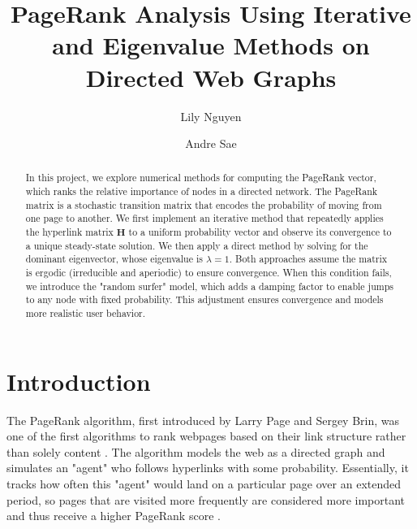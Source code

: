 \documentclass[linenumbers, twocolumn]{aastex631}
\begin{document}
\title{PageRank Analysis Using Iterative and Eigenvalue Methods on Directed Web Graphs}
\author{Lily Nguyen}

\author{Andre Sae}


\begin{abstract}
    In this project, we explore numerical methods for computing the PageRank 
    vector, which ranks the relative importance of nodes in a directed network.
    The PageRank matrix is a stochastic transition matrix that encodes the
    probability of moving from one page to another. We first implement an
    iterative method that repeatedly applies the hyperlink matrix $\boldsymbol{H}$
    to a uniform probability vector and observe its convergence to a unique 
    steady-state solution. We then apply a direct method by solving for the 
    dominant eigenvector, whose eigenvalue is $\lambda=1$. Both approaches 
    assume the matrix is ergodic (irreducible and aperiodic) to ensure
    convergence. When this condition fails, we introduce the "random surfer"
    model, which adds a damping factor to enable jumps to any node with fixed
    probability. This adjustment ensures convergence and models more realistic
    user behavior.
\end{abstract}



\section{Introduction} \label{sec:intro}

\noindent The PageRank algorithm, first introduced by Larry Page and Sergey Brin, was one
of the first algorithms to rank webpages based on their link structure rather
than solely content \cite{brin2}. The algorithm models the web as a directed graph
and simulates an "agent" who follows hyperlinks with some probability. 
Essentially, it tracks how often this "agent" would land on a particular 
page over an extended period, so pages that are visited more frequently are 
considered more important and thus receive a higher PageRank score \cite{brin1}.
\end{document}
